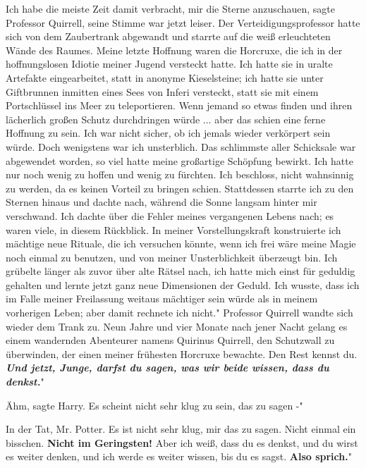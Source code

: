 \glqq{}Ich habe die meiste Zeit damit verbracht, mir die Sterne
anzuschauen\grqq{}, sagte Professor Quirrell, seine Stimme war jetzt leiser. Der
Verteidigungsprofessor hatte sich von dem Zaubertrank abgewandt und starrte auf
die weiß erleuchteten Wände des Raumes. \glqq{}Meine letzte Hoffnung waren die
Horcruxe, die ich in der hoffnungslosen Idiotie meiner Jugend versteckt hatte.
Ich hatte sie in uralte Artefakte eingearbeitet, statt in anonyme Kieselsteine;
ich hatte sie unter Giftbrunnen inmitten eines Sees von Inferi versteckt, statt
sie mit einem Portschlüssel ins Meer zu teleportieren. Wenn jemand so etwas
finden und ihren lächerlich großen Schutz durchdringen würde ... aber das schien
eine ferne Hoffnung zu sein. Ich war nicht sicher, ob ich jemals wieder
verkörpert sein würde. Doch wenigstens war ich unsterblich. Das schlimmste aller
Schicksale war abgewendet worden, so viel hatte meine großartige Schöpfung
bewirkt. Ich hatte nur noch wenig zu hoffen und wenig zu fürchten. Ich
beschloss, nicht wahnsinnig zu werden, da es keinen Vorteil zu bringen schien.
Stattdessen starrte ich zu den Sternen hinaus und dachte nach, während die Sonne
langsam hinter mir verschwand. Ich dachte über die Fehler meines vergangenen
Lebens nach; es waren viele, in diesem Rückblick. In meiner Vorstellungskraft
konstruierte ich mächtige neue Rituale, die ich versuchen könnte, wenn ich frei
wäre meine Magie noch einmal zu benutzen, und von meiner Unsterblichkeit
überzeugt bin. Ich grübelte länger als zuvor über alte Rätsel nach, ich hatte
mich einst für geduldig gehalten und lernte jetzt ganz neue Dimensionen der
Geduld. Ich wusste, dass ich im Falle meiner Freilassung weitaus mächtiger sein
würde als in meinem vorherigen Leben; aber damit rechnete ich nicht." Professor
Quirrell wandte sich wieder dem Trank zu. \glqq{}Neun Jahre und vier Monate nach
jener Nacht gelang es einem wandernden Abenteurer namens Quirinus Quirrell, den
Schutzwall zu überwinden, der einen meiner frühesten Horcruxe bewachte. Den Rest
kennst du. \textbf{\emph{Und jetzt, Junge, darfst du sagen, was wir beide
wissen, dass du denkst.}}"

\glqq{}Ähm\grqq{}, sagte Harry. \glqq{}Es scheint nicht sehr klug zu sein, das zu
sagen -"

\glqq{}In der Tat, Mr. Potter. Es ist nicht sehr klug, mir das zu sagen. Nicht
einmal ein bisschen. \textbf{Nicht im Geringsten!} Aber ich weiß, dass du es
denkst, und du wirst es weiter denken, und ich werde es weiter wissen, bis du es
sagst. \textbf{Also sprich.}"

